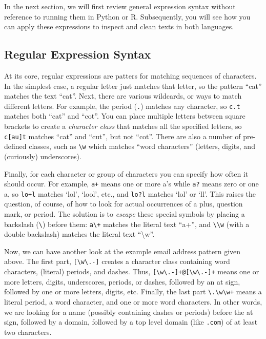 In the next section, we will first review general expression syntax without reference to running them in Python or R.
Subsequently, you will see how you can apply these expressions to inspect and clean texts in both languages.

\subsection{Regular Expression Syntax}\label{sec:regex}

At its core, regular expressions are patters for matching sequences of characters.
In the simplest case, a regular letter just matches that letter, so the pattern ``cat'' matches the text ``cat''.
Next, there are various wildcards, or ways to match different letters.
For example, the period (\verb|.|) matches any character, so \verb|c.t| matches both ``cat'' and ``cot''.
You can place multiple letters between square brackets to create a \emph{character class} that matches all the specified letters, so \verb|c[au]t| matches ``cat'' and ``cut'', but not ``cot''.
There are also a number of pre-defined classes, such as \verb|\w| which matches ``word characters'' (letters, digits, and (curiously) underscores).

Finally, for each character or group of characters you can specify how often it should occur.
For example, \verb|a+| means one or more a's while \verb|a?| means zero or one a, so \verb|lo+l| matches `lol', `lool', etc.,
and \verb|lo?l| matches `lol' or `ll'.
This raises the question, of course, of how to look for actual occurrences of a plus, question mark, or period.
The solution is to \emph{escape} these special symbols by placing a backslash (\verb|\|) before them:
\verb|a\+| matches the literal text ``a+'', and \verb|\\w| (with a double backslash) matches the literal text ``\textbackslash{}w''.

Now, we can have another look at the example email address pattern given above.
The first part, \verb|[\w\.-]| creates a character class containing word characters, (literal) periods, and dashes.
Thus, \verb|[\w\.-]+@[\w\.-]+| means one or more letters, digits, underscores, periods, or dashes, followed by an at sign,
followed by one or more letters, digits, etc.
Finally, the last part \verb|\.\w\w+| means a literal period, a word character, and one or more word characters.
In other words, we are looking for a name (possibly containing dashes or periods) before the at sign,
followed by a domain, followed by a top level domain (like \verb|.com|) of at least two characters.

